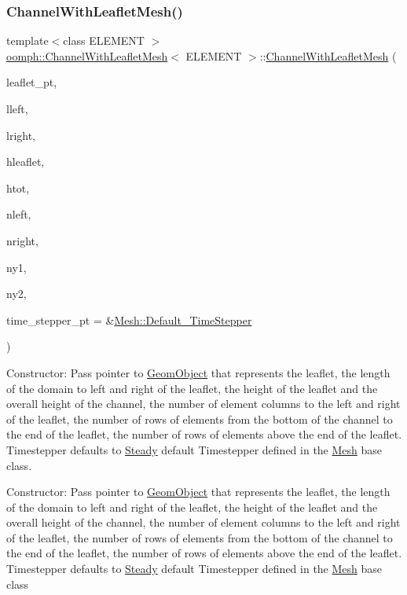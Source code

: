 \subsubsection{\texorpdfstring{Channel\+With\+Leaflet\+Mesh()}{ChannelWithLeafletMesh()}}
{\footnotesize\ttfamily template$<$class E\+L\+E\+M\+E\+NT $>$ \\
\hyperlink{classoomph_1_1ChannelWithLeafletMesh}{oomph\+::\+Channel\+With\+Leaflet\+Mesh}$<$ E\+L\+E\+M\+E\+NT $>$\+::\hyperlink{classoomph_1_1ChannelWithLeafletMesh}{Channel\+With\+Leaflet\+Mesh} (\begin{DoxyParamCaption}\item[{\hyperlink{classoomph_1_1GeomObject}{Geom\+Object} $\ast$}]{leaflet\+\_\+pt,  }\item[{const double \&}]{lleft,  }\item[{const double \&}]{lright,  }\item[{const double \&}]{hleaflet,  }\item[{const double \&}]{htot,  }\item[{const unsigned \&}]{nleft,  }\item[{const unsigned \&}]{nright,  }\item[{const unsigned \&}]{ny1,  }\item[{const unsigned \&}]{ny2,  }\item[{\hyperlink{classoomph_1_1TimeStepper}{Time\+Stepper} $\ast$}]{time\+\_\+stepper\+\_\+pt = {\ttfamily \&\hyperlink{classoomph_1_1Mesh_a12243d0fee2b1fcee729ee5a4777ea10}{Mesh\+::\+Default\+\_\+\+Time\+Stepper}} }\end{DoxyParamCaption})}



Constructor\+: Pass pointer to \hyperlink{classoomph_1_1GeomObject}{Geom\+Object} that represents the leaflet, the length of the domain to left and right of the leaflet, the height of the leaflet and the overall height of the channel, the number of element columns to the left and right of the leaflet, the number of rows of elements from the bottom of the channel to the end of the leaflet, the number of rows of elements above the end of the leaflet. Timestepper defaults to \hyperlink{classoomph_1_1Steady}{Steady} default Timestepper defined in the \hyperlink{classoomph_1_1Mesh}{Mesh} base class. 

Constructor\+: Pass pointer to \hyperlink{classoomph_1_1GeomObject}{Geom\+Object} that represents the leaflet, the length of the domain to left and right of the leaflet, the height of the leaflet and the overall height of the channel, the number of element columns to the left and right of the leaflet, the number of rows of elements from the bottom of the channel to the end of the leaflet, the number of rows of elements above the end of the leaflet. Timestepper defaults to \hyperlink{classoomph_1_1Steady}{Steady} default Timestepper defined in the \hyperlink{classoomph_1_1Mesh}{Mesh} base class 

